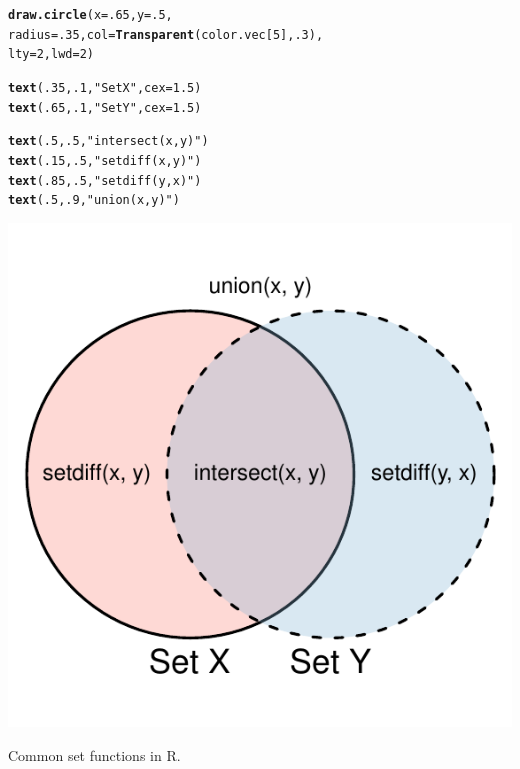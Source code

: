 \documentclass{tufte-book}\usepackage[]{graphicx}\usepackage[]{color}
\makeatletter
\def\maxwidth{ %
  \ifdim\Gin@nat@width>\linewidth
    \linewidth
  \else
    \Gin@nat@width
  \fi
}
\newcommand{\hlnum}[1]{\textcolor[rgb]{0.686,0.059,0.569}{#1}}%
\newcommand{\hlstr}[1]{\textcolor[rgb]{0.192,0.494,0.8}{#1}}%
\newcommand{\hlstd}[1]{\textcolor[rgb]{0.345,0.345,0.345}{#1}}%
\newcommand{\hlkwc}[1]{\textcolor[rgb]{0.333,0.667,0.333}{#1}}%
\newcommand{\hlkwd}[1]{\textcolor[rgb]{0.737,0.353,0.396}{\textbf{#1}}}%
\newenvironment{kframe}{%
 \def\at@end@of@kframe{}%
 \ifinner\ifhmode%
  \def\at@end@of@kframe{\end{minipage}}%
  \begin{minipage}{\columnwidth}%
 \fi\fi%
 \def\FrameCommand##1{\hskip\@totalleftmargin \hskip-\fboxsep
 \colorbox{shadecolor}{##1}\hskip-\fboxsep
     \hskip-\linewidth \hskip-\@totalleftmargin \hskip\columnwidth}%
 \MakeFramed {\advance\hsize-\width
   \@totalleftmargin\z@ \linewidth\hsize
   \@setminipage}}%
 {\par\unskip\endMakeFramed%
 \at@end@of@kframe}
\newenvironment{knitrout}{}{} %
\makeatother
\begin{document}
\begin{marginfigure}
\begin{tiny}
\begin{knitrout}
\begin{kframe}
\begin{alltt}
\hlkwd{draw.circle}\hlstd{(}\hlkwc{x} \hlstd{=} \hlnum{.65}\hlstd{,} \hlkwc{y} \hlstd{=} \hlnum{.5}\hlstd{,}
            \hlkwc{radius} \hlstd{=} \hlnum{.35}\hlstd{,} \hlkwc{col} \hlstd{=} \hlkwd{Transparent}\hlstd{(color.vec[}\hlnum{5}\hlstd{],} \hlnum{.3}\hlstd{),}
            \hlkwc{lty} \hlstd{=} \hlnum{2}\hlstd{,} \hlkwc{lwd} \hlstd{=} \hlnum{2}\hlstd{)}

\hlkwd{text}\hlstd{(}\hlnum{.35}\hlstd{,} \hlnum{.1}\hlstd{,} \hlstr{"Set X"}\hlstd{,} \hlkwc{cex} \hlstd{=} \hlnum{1.5}\hlstd{)}
\hlkwd{text}\hlstd{(}\hlnum{.65}\hlstd{,} \hlnum{.1}\hlstd{,} \hlstr{"Set Y"}\hlstd{,} \hlkwc{cex} \hlstd{=} \hlnum{1.5}\hlstd{)}

\hlkwd{text}\hlstd{(}\hlnum{.5}\hlstd{,} \hlnum{.5}\hlstd{,} \hlstr{"intersect(x, y)"}\hlstd{)}
\hlkwd{text}\hlstd{(}\hlnum{.15}\hlstd{,} \hlnum{.5}\hlstd{,} \hlstr{"setdiff(x, y)"}\hlstd{)}
\hlkwd{text}\hlstd{(}\hlnum{.85}\hlstd{,} \hlnum{.5}\hlstd{,} \hlstr{"setdiff(y, x)"}\hlstd{)}
\hlkwd{text}\hlstd{(}\hlnum{.5}\hlstd{,} \hlnum{.9}\hlstd{,} \hlstr{"union(x, y)"}\hlstd{)}
\end{alltt}
\end{kframe}
\includegraphics[width=\maxwidth]{figure/unnamed-chunk-97-1} 

\end{knitrout}
\end{tiny}
\label{fig:setfunctions}
\caption{Common set functions in R.}
\end{marginfigure}
\end{document}
